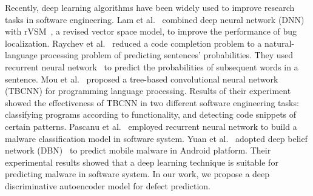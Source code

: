 Recently, deep learning algorithms have been widely used to improve research tasks in software engineering. Lam et al.~\cite{lam2015combining} combined deep neural network (DNN)~\cite{hecht1988theory} with rVSM~\cite{zhou2012should}, a revised vector space model, to improve the performance of bug localization. Raychev et al.~\cite{raychev2014code} reduced a code completion problem to a natural-language processing problem of predicting sentences' probabilities. They used recurrent neural network~\cite{mikolov2010recurrent} to predict the probabilities of subsequent words in a sentence. Mou et al.~\cite{mou2014tbcnn} proposed a tree-based convolutional neural network (TBCNN) for programming language processing. Results of their experiment showed the effectiveness of TBCNN in two different software engineering tasks: classifying programs according to functionality, and detecting code snippets of certain patterns. Pascanu et al.~\cite{pascanu2015malware} employed recurrent neural network to build a malware classification model in software system. Yuan et al.~\cite{yuan2014droid} adopted deep belief network (DBN)~\cite{hinton2009deep} to predict mobile malware in Android platform. Their experimental results showed that a deep learning technique is suitable for predicting malware in software system. In our work, we propose a deep discriminative autoencoder model for defect prediction.




